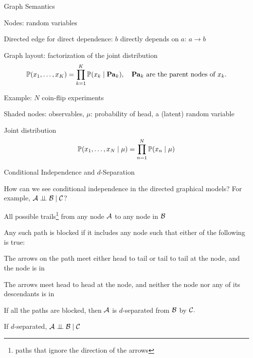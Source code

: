\documentclass[handout,fleqn,aspectratio=169]{beamer}
\begin{document}
\begin{frame}{Graph Semantics}

{
}
{
}
\vspace{-0.3cm}
\plitemsep 0.03in
\bci 
\item Nodes: random variables
\item Directed edge for direct dependence: $b$ directly depends on $a$: $a \rightarrow b$
\item Graph layout: factorization of the joint distribution
$$
\mathbb{P}( x_1, \ldots, x_K ) = \prod_{k=1}^K \mathbb{P}( x_k \mid \mathbf{Pa}_k ), \quad\text{$\mathbf{Pa}_k$ are the parent nodes of $x_k.$}
$$
\eci
\end{frame}

\begin{frame}{Example: $N$ coin-flip experiments}

\plitemsep 0.07in
\bci 
\item Shaded nodes: observables, $\mu$: probability of head, a (latent) random variable
\item Joint distribution
$$
\mathbb{P}( x_1, \ldots, x_N \mid \mu ) = \prod_{n=1}^N \mathbb{P}( x_n \mid \mu )
$$
\eci
\end{frame}

\begin{frame}{Conditional Independence and $d$-Separation}

\plitemsep 0.07in
\bci 
\item \question How can we see conditional independence in the directed graphical models? For example, $\mathcal A \perp \!\!\! \perp \mathcal B \mid \mathcal C$?
\item {}
\bci
\item All possible trails\footnote{paths that ignore the direction of the arrows} from any node $\mathcal A$ to any node in $\mathcal B$
\item Any such path is blocked if it includes any node such that either of the following is true:
\bci
\item The arrows on the path meet either head to tail or tail to tail at the node, and the node is in 
\item The arrows meet head to head at the node, and neither the node nor any of its descendants is in 
\eci
\item If all the paths are blocked, then $\mathcal A$ is $d$-separated from $\mathcal B$ by $\mathcal C.$
\item If $d$-separated, $\mathcal A \perp \!\!\! \perp \mathcal B \mid \mathcal C$
\eci
\eci



\end{frame}
\end{document}
